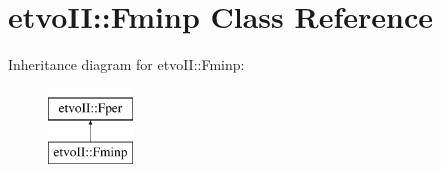 \hypertarget{classetvo_i_i_1_1_fminp}{}\section{etvo\+II\+:\+:Fminp Class Reference}
\label{classetvo_i_i_1_1_fminp}
Inheritance diagram for etvo\+II\+:\+:Fminp\+:\begin{figure}[H]
\begin{center}
\leavevmode
\includegraphics[height=2.000000cm]{classetvo_i_i_1_1_fminp}
\end{center}
\end{figure}
